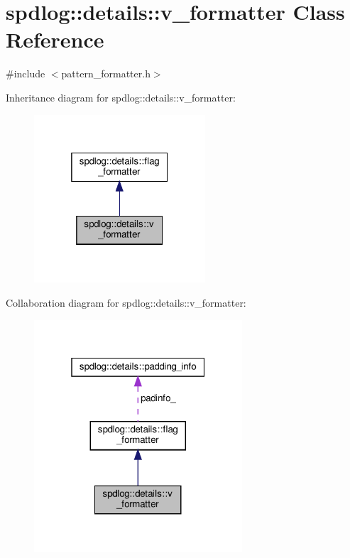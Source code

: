 \hypertarget{classspdlog_1_1details_1_1v__formatter}{}\section{spdlog\+:\+:details\+:\+:v\+\_\+formatter Class Reference}
\label{classspdlog_1_1details_1_1v__formatter}


{\ttfamily \#include $<$pattern\+\_\+formatter.\+h$>$}



Inheritance diagram for spdlog\+:\+:details\+:\+:v\+\_\+formatter\+:
\nopagebreak
\begin{figure}[H]
\begin{center}
\leavevmode
\includegraphics[width=181pt]{classspdlog_1_1details_1_1v__formatter__inherit__graph}
\end{center}
\end{figure}


Collaboration diagram for spdlog\+:\+:details\+:\+:v\+\_\+formatter\+:
\nopagebreak
\begin{figure}[H]
\begin{center}
\leavevmode
\includegraphics[width=220pt]{classspdlog_1_1details_1_1v__formatter__coll__graph}
\end{center}
\end{figure}
